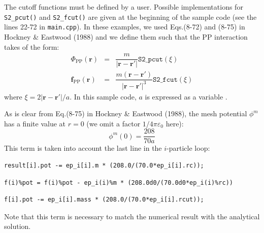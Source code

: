 The cutoff functions must be defined by a user. Possible implementations for \texttt{S2\_pcut()} and \texttt{S2\_fcut()} are given at the beginning of the sample code (see the lines 22-72 in \texttt{main.cpp}). In these examples, we used Eqs.(8-72) and (8-75) in Hockney \& Eastwood (1988) and we define them such that the PP interaction takes of the form:
\begin{eqnarray}
\Phi_{\mathrm{PP}}(\bm{r}) & = & \dfrac{m}{|\bm{r}-\bm{r}'|}\mathtt{S2\_pcut}(\xi) \\
\bm{f}_{\mathrm{PP}}(\bm{r}) & = & \dfrac{m(\bm{r}-\bm{r}')}{|\bm{r}-\bm{r}'|^{3}}\mathtt{S2\_fcut}(\xi)
\end{eqnarray}
where $\xi = 2|\bm{r}-\bm{r}'|/a$.
In this sample code, $a$ is expressed as a variable .

As is clear from Eq.(8-75) in Hockney \& Eastwood (1988), the mesh potential $\phi^{m}$ has a finite value at $r=0$ (we omit a factor $1/4\pi\varepsilon_{0}$ here):
\begin{equation}
\phi^{m}(0) = \dfrac{208}{70a}
\end{equation}
This term is taken into account the last line in the $i$-particle loop:
\ifCpp
\begin{lstlisting}
result[i].pot -= ep_i[i].m * (208.0/(70.0*ep_i[i].rc));
\end{lstlisting}
\endifCpp
\ifFtn
\begin{lstlisting}
f(i)%pot = f(i)%pot - ep_i(i)%m * (208.0d0/(70.0d0*ep_i(i)%rc))
\end{lstlisting}
\endifFtn
\ifC
\begin{lstlisting}
f[i].pot -= ep_i[i].mass * (208.0/(70.0*ep_i[i].rcut));
\end{lstlisting}
\endifC
Note that this term is necessary to match the numerical result with the analytical solution.

